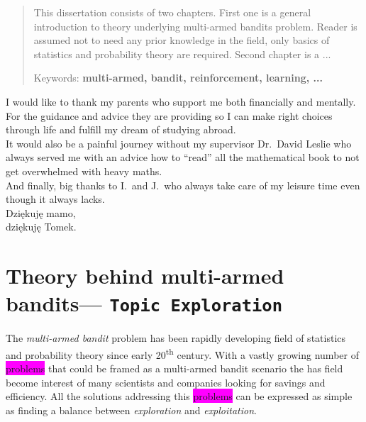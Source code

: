 \documentclass[12pt, a4paper, pdflatex]{report}
\newcommand{\ts}{\textsuperscript}
\newenvironment{dedication}
  {\clearpage           %
   \thispagestyle{empty}%
   \vspace*{\stretch{1}}%
   \itshape             %
   \raggedleft          %
  }
  {\par %
   \vspace{\stretch{3}} %
   \clearpage           %
  }
\begin{document}
\begin{abstract}
This dissertation consists of two chapters. First one is a general introduction to theory underlying multi-armed bandits problem. Reader is assumed not to need any prior knowledge in the field, only basics of statistics and probability theory are required. Second chapter is a ...
\begin{center}
Keywords: \textbf{multi-armed, bandit, reinforcement, learning, ...}
\end{center}
\end{abstract}

\begin{dedication}
I would like to thank my parents who support me both financially and mentally. For the guidance and advice they are providing so I can make right choices through life and fulfill my dream of studying abroad.\\
It would also be a painful journey without my supervisor Dr.\ David Leslie who always served me with an advice how to ``read'' all the mathematical book to not get overwhelmed with heavy maths.\\
And finally, big thanks to I.\ and J.\ who always take care of my leisure time even though it always lacks.\\[2cm]
Dzi\k{e}kuj\k{e} mamo,\\
dzi\k{e}kuj\k{e} Tomek.
\end{dedication}

\newpage
\tableofcontents
\newpage

\chapter{Theory behind multi-armed bandits--- \texttt{Topic Exploration}}
The \emph{multi-armed bandit} problem has been rapidly developing field of statistics and probability theory since early 20\ts{th} century. With a vastly growing number of \colorbox{magenta}{problems} that could be framed as a multi-armed bandit scenario the has field become interest of many scientists and companies looking for savings and efficiency. All the solutions addressing this \colorbox{magenta}{problems} can be expressed as simple as finding a balance between \emph{exploration} and \emph{exploitation}.
\end{document}
